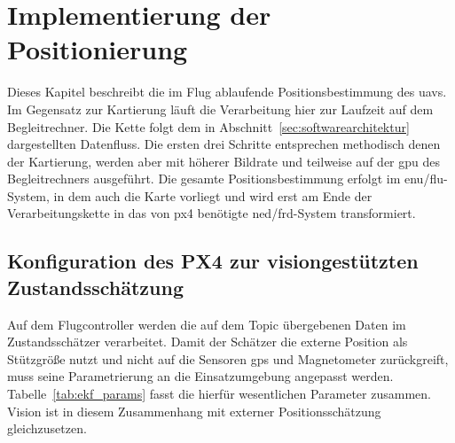 
\chapter{Implementierung der Positionierung}
\label{cap:implementierung_positionsbestimmung}
Dieses Kapitel beschreibt die im Flug ablaufende Positionsbestimmung des \gls{uav}s.
Im Gegensatz zur Kartierung läuft die Verarbeitung hier zur Laufzeit auf dem Begleitrechner.
Die Kette folgt dem in Abschnitt~\ref{sec:softwarearchitektur} dargestellten 
Datenfluss.
Die ersten drei Schritte entsprechen methodisch denen der Kartierung, werden aber mit höherer Bildrate und teilweise auf der \gls{gpu} des Begleitrechners ausgeführt.
Die gesamte Positionsbestimmung erfolgt im \gls{enu}/\gls{flu}-System, in dem auch die Karte vorliegt und wird erst am 
Ende der Verarbeitungskette in das von \gls{px4} benötigte \gls{ned}/\gls{frd}-System transformiert.

\section{Konfiguration des PX4 zur visiongestützten Zustandsschätzung}
\label{sec:pos_ekf_konfiguration}
Auf dem Flugcontroller werden die auf dem Topic  
übergebenen Daten im Zustandsschätzer verarbeitet.
Damit der Schätzer die externe Position als Stützgröße nutzt und nicht auf die Sensoren \gls{gps} und Magnetometer zurückgreift, 
muss seine Parametrierung an die Einsatzumgebung angepasst werden.
Tabelle~\ref{tab:ekf_params} fasst die hierfür wesentlichen Parameter zusammen. 
Vision ist in diesem Zusammenhang mit externer Positionsschätzung gleichzusetzen.

